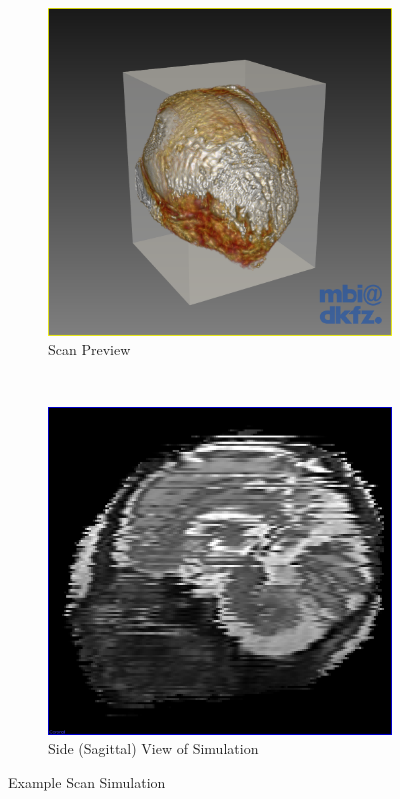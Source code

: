 \begin{figure}[H]
  \centering
  \begin{subfigure}[b]{0.5\textwidth}
    \includegraphics[width=\textwidth]{images/scan_simulation/scan_axial_preview.png}
    \caption{Scan Preview}\label{fig:scansimulationpreview}
  \end{subfigure}%
  ~ %
  \begin{subfigure}[b]{0.5\textwidth}
    \includegraphics[width=\textwidth]{images/scan_simulation/scan_axial_result.png}
    \caption{Side (Sagittal) View of Simulation}\label{fig:scansimulationresult}
  \end{subfigure}
  \caption{Example Scan Simulation}\label{fig:scansimulationexample}
\end{figure}

